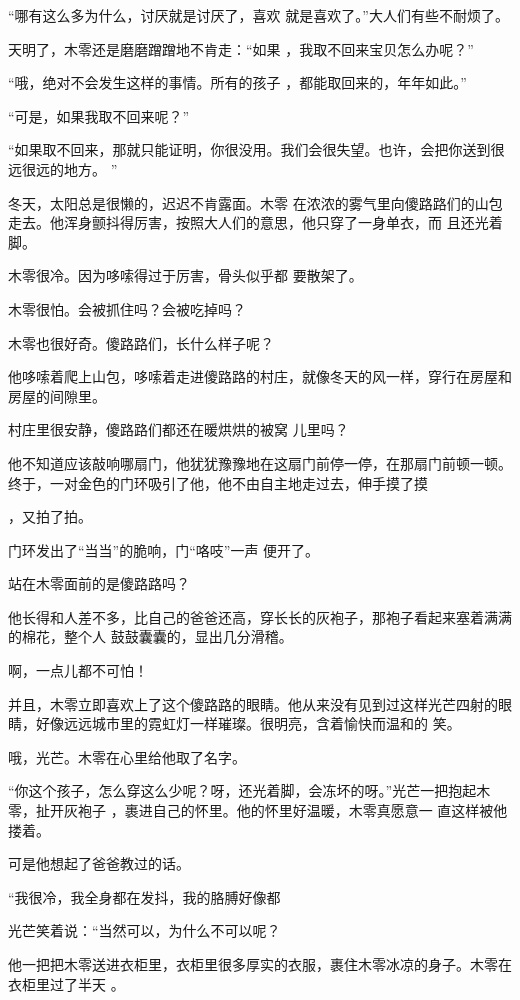 \documentclass{article}
\begin{document}
“哪有这么多为什么，讨厌就是讨厌了，喜欢
就是喜欢了。”大人们有些不耐烦了。 

天明了，木零还是磨磨蹭蹭地不肯走：“如果
，我取不回来宝贝怎么办呢？” 

“哦，绝对不会发生这样的事情。所有的孩子
，都能取回来的，年年如此。” 


“可是，如果我取不回来呢？” 

“如果取不回来，那就只能证明，你很没用。我们会很失望。也许，会把你送到很远很远的地方。
” 

冬天，太阳总是很懒的，迟迟不肯露面。木零
\newpage
在浓浓的雾气里向傻路路们的山包走去。他浑身颤抖得厉害，按照大人们的意思，他只穿了一身单衣，而
且还光着脚。 

木零很冷。因为哆嗦得过于厉害，骨头似乎都
要散架了。 


木零很怕。会被抓住吗？会被吃掉吗？ 


木零也很好奇。傻路路们，长什么样子呢？ 

他哆嗦着爬上山包，哆嗦着走进傻路路的村庄，就像冬天的风一样，穿行在房屋和房屋的间隙里。

村庄里很安静，傻路路们都还在暖烘烘的被窝
儿里吗？ 

他不知道应该敲响哪扇门，他犹犹豫豫地在这扇门前停一停，在那扇门前顿一顿。终于，一对金色的门环吸引了他，他不由自主地走过去，伸手摸了摸

\newpage
，又拍了拍。 

门环发出了“当当”的脆响，门“咯吱”一声
便开了。 


站在木零面前的是傻路路吗？ 

他长得和人差不多，比自己的爸爸还高，穿长长的灰袍子，那袍子看起来塞着满满的棉花，整个人
鼓鼓囊囊的，显出几分滑稽。 


啊，一点儿都不可怕！ 

并且，木零立即喜欢上了这个傻路路的眼睛。他从来没有见到过这样光芒四射的眼睛，好像远远城市里的霓虹灯一样璀璨。很明亮，含着愉快而温和的
笑。 


哦，光芒。木零在心里给他取了名字。 

“你这个孩子，怎么穿这么少呢？呀，还光着脚，会冻坏的呀。”光芒一把抱起木零，扯开灰袍子
\newpage
，裹进自己的怀里。他的怀里好温暖，木零真愿意一
直这样被他搂着。 


可是他想起了爸爸教过的话。 

“我很冷，我全身都在发抖，我的胳膊好像都

光芒笑着说：“当然可以，为什么不可以呢？

他一把把木零送进衣柜里，衣柜里很多厚实的衣服，裹住木零冰凉的身子。木零在衣柜里过了半天
。 
\end{document}
